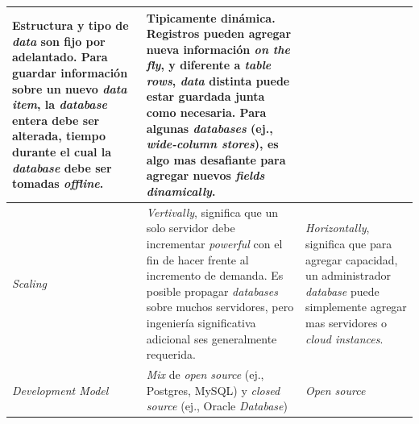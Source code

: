 \begin{table}[h!]
\begin{tabular}{ |L{0.1\paperwidth}|L{0.3\paperwidth}|L{0.3\paperwidth}|}
	Estructura y tipo de \textit{data} son fijo por adelantado. Para guardar información sobre un nuevo \textit{data item}, la \textit{database} entera debe ser alterada, tiempo durante el cual la \textit{database} debe ser tomadas \textit{offline}.&

	Tipicamente dinámica. Registros pueden agregar nueva información \textit{on the fly}, y diferente a \textit{ table rows}, \textit{data} distinta puede estar guardada junta como necesaria. Para algunas \textit{databases} (ej., \textit{wide-column stores}), es algo mas desafiante para agregar nuevos \textit{fields dinamically}.

\\ \hline
	\textit{Scaling}&%
	
	\textit{Vertivally}, significa que un solo servidor debe incrementar \textit{powerful} con el fin de hacer frente al incremento de demanda. Es posible propagar  \textit{databases} sobre muchos servidores, pero ingeniería significativa adicional ses generalmente requerida.&
	
	\textit{Horizontally}, significa que para agregar capacidad, un administrador \textit{database} puede simplemente agregar mas servidores o \textit{cloud instances}.
	
\\ \hline
	\textit{Development Model}&
	
	\textit{Mix} de \textit{open source} (ej., Postgres, MySQL) y \textit{closed source} (ej., Oracle \textit{Database})&
	\textit{Open source}
	

\end{tabular}
\end{table}
